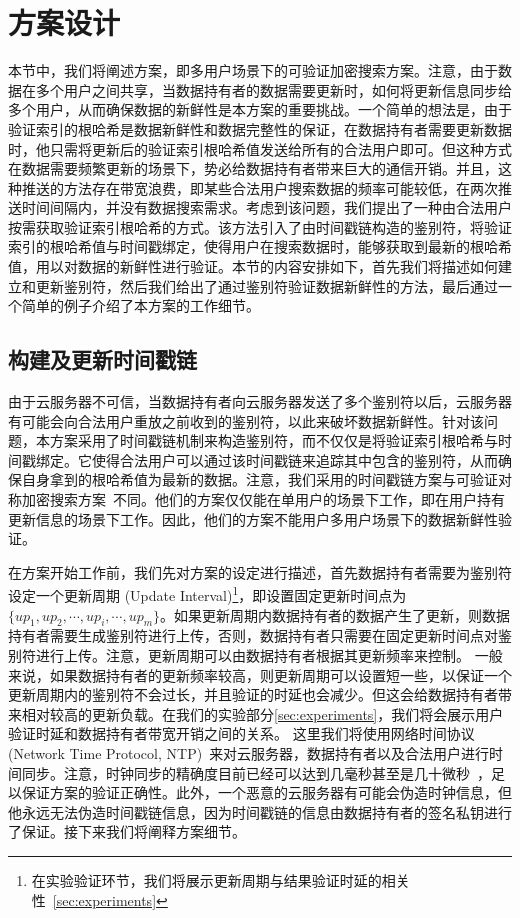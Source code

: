\section{方案设计}
本节中，我们将阐述\multi 方案，即多用户场景下的可验证加密搜索方案。注意，由于数据在多个用户之间共享，当数据持有者的数据需要更新时，如何将更新信息同步给多个用户，从而确保数据的新鲜性是本方案的重要挑战。一个简单的想法是，由于验证索引的根哈希是数据新鲜性和数据完整性的保证，在数据持有者需要更新数据时，他只需将更新后的验证索引根哈希值发送给所有的合法用户即可。但这种方式在数据需要频繁更新的场景下，势必给数据持有者带来巨大的通信开销。并且，这种推送的方法存在带宽浪费，即某些合法用户搜索数据的频率可能较低，在两次推送时间间隔内，并没有数据搜索需求。考虑到该问题，我们提出了一种由合法用户按需获取验证索引根哈希的方式。该方法引入了由时间戳链构造的鉴别符，将验证索引的根哈希值与时间戳绑定，使得用户在搜索数据时，能够获取到最新的根哈希值，用以对数据的新鲜性进行验证。本节的内容安排如下，首先我们将描述如何建立和更新鉴别符，然后我们给出了通过鉴别符验证数据新鲜性的方法，最后通过一个简单的例子介绍了本方案的工作细节。

\subsection{构建及更新时间戳链}
由于云服务器不可信，当数据持有者向云服务器发送了多个鉴别符以后，云服务器有可能会向合法用户重放之前收到的鉴别符，以此来破坏数据新鲜性。针对该问题，本方案采用了时间戳链机制来构造鉴别符，而不仅仅是将验证索引根哈希与时间戳绑定。它使得合法用户可以通过该时间戳链来追踪其中包含的鉴别符，从而确保自身拿到的根哈希值为最新的数据。注意，我们采用的时间戳链方案与可验证对称加密搜索方案~\cite{stefanov2014practical}不同。他们的方案仅仅能在单用户的场景下工作，即在用户持有更新信息的场景下工作。因此，他们的方案不能用户多用户场景下的数据新鲜性验证。



在方案开始工作前，我们先对方案的设定进行描述，首先数据持有者需要为鉴别符设定一个更新周期 (Update Interval)\footnote{在实验验证环节，我们将展示更新周期与结果验证时延的相关性~\ref{sec:experiments}}，即设置固定更新时间点为$\{up_1, up_2, \cdots, up_i, \cdots, up_m\}$。如果更新周期内数据持有者的数据产生了更新，则数据持有者需要生成鉴别符进行上传，否则，数据持有者只需要在固定更新时间点对鉴别符进行上传。注意，更新周期可以由数据持有者根据其更新频率来控制。 一般来说，如果数据持有者的更新频率较高，则更新周期可以设置短一些，以保证一个更新周期内的鉴别符不会过长，并且验证的时延也会减少。但这会给数据持有者带来相对较高的更新负载。在我们的实验部分\ref{sec:experiments}，我们将会展示用户验证时延和数据持有者带宽开销之间的关系。
这里我们将使用网络时间协议 (Network Time Protocol, NTP)~\cite{mills1991internet, mills2010network}来对云服务器，数据持有者以及合法用户进行时间同步。注意，时钟同步的精确度目前已经可以达到几毫秒甚至是几十微秒~\cite{kopetz1987clock, elson2002fine, zhou2007accurate}，足以保证\multi 方案的验证正确性。此外，一个恶意的云服务器有可能会伪造时钟信息，但他永远无法伪造时间戳链信息，因为时间戳链的信息由数据持有者的签名私钥进行了保证。接下来我们将阐释方案细节。


